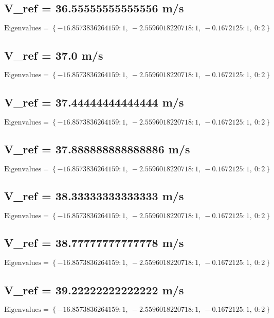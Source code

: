 \documentclass{article}
\begin{document}
\subsection*{V_ref = 36.55555555555556 m/s}
\begin{equation}
\text{Eigenvalues} = \left\{ -16.8573836264159 : 1, \  -2.5596018220718 : 1, \  -0.1672125 : 1, \  0 : 2\right\}
\end{equation}
\subsection*{V_ref = 37.0 m/s}
\begin{equation}
\text{Eigenvalues} = \left\{ -16.8573836264159 : 1, \  -2.5596018220718 : 1, \  -0.1672125 : 1, \  0 : 2\right\}
\end{equation}
\subsection*{V_ref = 37.44444444444444 m/s}
\begin{equation}
\text{Eigenvalues} = \left\{ -16.8573836264159 : 1, \  -2.5596018220718 : 1, \  -0.1672125 : 1, \  0 : 2\right\}
\end{equation}
\subsection*{V_ref = 37.888888888888886 m/s}
\begin{equation}
\text{Eigenvalues} = \left\{ -16.8573836264159 : 1, \  -2.5596018220718 : 1, \  -0.1672125 : 1, \  0 : 2\right\}
\end{equation}
\subsection*{V_ref = 38.33333333333333 m/s}
\begin{equation}
\text{Eigenvalues} = \left\{ -16.8573836264159 : 1, \  -2.5596018220718 : 1, \  -0.1672125 : 1, \  0 : 2\right\}
\end{equation}
\subsection*{V_ref = 38.77777777777778 m/s}
\begin{equation}
\text{Eigenvalues} = \left\{ -16.8573836264159 : 1, \  -2.5596018220718 : 1, \  -0.1672125 : 1, \  0 : 2\right\}
\end{equation}
\subsection*{V_ref = 39.22222222222222 m/s}
\begin{equation}
\text{Eigenvalues} = \left\{ -16.8573836264159 : 1, \  -2.5596018220718 : 1, \  -0.1672125 : 1, \  0 : 2\right\}
\end{equation}
\end{document}
